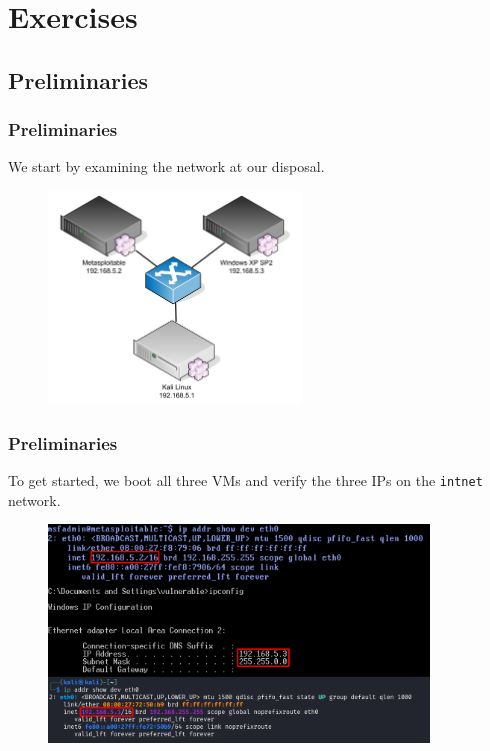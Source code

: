 \documentclass[handout]{beamer}
\begin{document}

\section{Exercises}

\subsection{Preliminaries}

\begin{frame}
    \frametitle{Preliminaries}
    
    We start by examining the network at our disposal. 
    
    \begin{figure}
    	\centering
    	\includegraphics[width=0.6\textwidth]{../drawable/preliminaries_screenshots/prel-net.png}
	\end{figure}
\end{frame}

\begin{frame}
    \frametitle{Preliminaries}
    
    To get started, we boot all three VMs and verify the three IPs on the \texttt{intnet} network.
    
	\begin{figure}
    	\centering
    	\includegraphics[width=0.9\textwidth]{../drawable/preliminaries_screenshots/prel-ips.png}
	\end{figure}
    
\end{frame}
\end{document}
